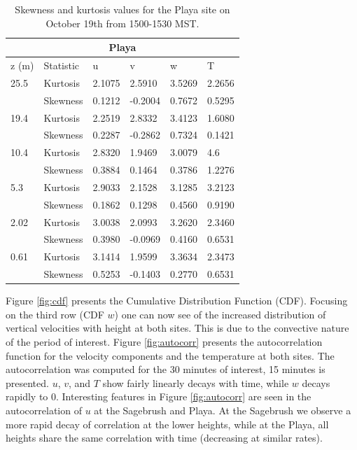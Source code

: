 \documentclass[]{article}
\begin{document}
\begin{table}
\begin{tabular}{ |p{1cm}|p{1.5cm}|p{1cm}|p{1.25cm}|p{1cm}| p{1.25cm}|}
	\hline
	\multicolumn{6}{|c|}{Playa} \\
	\hline\hline
	z (m) & Statistic & u &  v & w & T\\
	\hline
	25.5 & Kurtosis & 2.1075 & 2.5910 & 3.5269 &  2.2656\\
	&Skewness & 0.1212 & -0.2004 & 0.7672 & 0.5295\\
	\hline
	19.4 & Kurtosis & 2.2519 & 2.8332 & 3.4123 &1.6080 \\
	&Skewness & 0.2287 & -0.2862 & 0.7324 & 0.1421\\
	\hline
	10.4 & Kurtosis & 2.8320 & 1.9469 & 3.0079 &4.6 \\
	&Skewness & 0.3884 & 0.1464 & 0.3786 &1.2276\\
	\hline
	5.3 & Kurtosis & 2.9033 & 2.1528  & 3.1285 & 3.2123  \\
	&Skewness & 0.1862 & 0.1298 & 0.4560 & 0.9190\\
	\hline
	2.02 & Kurtosis &\cellcolor{red!25} 3.0038 & 2.0993 & 3.2620  & 2.3460\\
	&Skewness & \cellcolor{blue!25} 0.3980 & -0.0969 & 0.4160 & 0.6531\\
	\hline
	0.61 & Kurtosis & \cellcolor{red!25} 3.1414 & 1.9599 & 3.3634  & 2.3473\\
	&Skewness & \cellcolor{blue!25} 0.5253 & -0.1403 & 0.2770 &0.6531\\
	\hline
\end{tabular}
\label{tab:kurt_playa}
\caption{Skewness and kurtosis values for the Playa site on October 19th from 1500-1530 MST. }
\end{table}
Figure \ref{fig:cdf} presents the Cumulative Distribution Function (CDF). Focusing on the third row (CDF $w$) one can now see of the increased distribution of vertical velocities with height at both sites. This is due to the convective nature of the period of interest. Figure \ref{fig:autocorr} presents the autocorrelation function for the velocity components and the temperature at both sites. The autocorrelation was computed for the 30 minutes of interest, 15 minutes is presented. $u$, $v$, and $T$ show fairly linearly decays with time, while $w$ decays rapidly to 0. Interesting features in Figure \ref{fig:autocorr} are seen in the autocorrelation of $u$ at the Sagebrush and Playa. At the Sagebrush we observe a more rapid decay of correlation at the lower heights, while at the Playa, all heights share the same correlation with time (decreasing at similar rates). 
\end{document}
